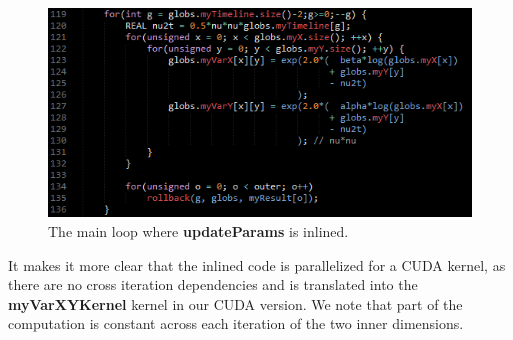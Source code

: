 \begin{figure}[!ht]
	\centering
		\includegraphics[scale=0.75]{input/figures/inline_updateparams.png}
		\caption{The main loop where \textbf{updateParams} is inlined.\label{fig:inline_updateparams}}
\end{figure}

It makes it more clear that the inlined
code is parallelized for a CUDA kernel, as there are no cross iteration
dependencies and is translated into the \textbf{myVarXYKernel} kernel in our
CUDA version. We note that part of the computation is constant across each
iteration of the two inner dimensions.
